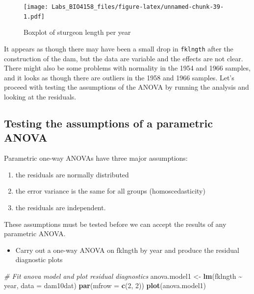 \documentclass[
  12pt,
]{book}
\newenvironment{Shaded}{\begin{snugshade}}{\end{snugshade}}
\newcommand{\CommentTok}[1]{\textcolor[rgb]{0.56,0.35,0.01}{\textit{#1}}}
\newcommand{\DataTypeTok}[1]{\textcolor[rgb]{0.13,0.29,0.53}{#1}}
\newcommand{\DecValTok}[1]{\textcolor[rgb]{0.00,0.00,0.81}{#1}}
\newcommand{\KeywordTok}[1]{\textcolor[rgb]{0.13,0.29,0.53}{\textbf{#1}}}
\newcommand{\NormalTok}[1]{#1}
\newcommand{\OperatorTok}[1]{\textcolor[rgb]{0.81,0.36,0.00}{\textbf{#1}}}
\newcommand{\StringTok}[1]{\textcolor[rgb]{0.31,0.60,0.02}{#1}}
\providecommand{\tightlist}{%
  \setlength{\itemsep}{0pt}\setlength{\parskip}{0pt}}
\begin{document}
\begin{figure}
\centering
\texttt{[image: Labs\_BIO4158\_files/figure-latex/unnamed-chunk-39-1.pdf]}
\caption{\label{fig:unnamed-chunk-39}Boxplot of sturgeon length per year}
\end{figure}

It appears as though there may have been a small drop in \texttt{fklngth} after the construction of the dam, but the data are variable and the effects are not clear. There might also be some problems with normality in the 1954 and 1966 samples, and it looks as though there are outliers in the 1958 and 1966 samples. Let's proceed with testing the assumptions of the ANOVA by running the analysis and looking at the residuals.

\hypertarget{testing-the-assumptions-of-a-parametric-anova}{%
\subsection{Testing the assumptions of a parametric ANOVA}\label{testing-the-assumptions-of-a-parametric-anova}}

Parametric one-way ANOVAs have three major assumptions:

\begin{enumerate}
\def\labelenumi{\arabic{enumi}.}
\tightlist
\item
  the residuals are normally distributed
\item
  the error variance is the same for all groups (homoscedasticity)
\item
  the residuals are independent.
\end{enumerate}

These assumptions must be tested before we can accept the results of any parametric ANOVA.

\begin{itemize}
\tightlist
\item
  Carry out a one-way ANOVA on fklngth by year and produce the residual diagnostic plots
\end{itemize}

\begin{Shaded}
\begin{Highlighting}[]
\CommentTok{\# Fit anova model and plot residual diagnostics}
\NormalTok{anova.model1 \textless{}{-}}\StringTok{ }\KeywordTok{lm}\NormalTok{(fklngth }\OperatorTok{\textasciitilde{}}\StringTok{ }\NormalTok{year, }\DataTypeTok{data =}\NormalTok{ dam10dat)}
\KeywordTok{par}\NormalTok{(}\DataTypeTok{mfrow =} \KeywordTok{c}\NormalTok{(}\DecValTok{2}\NormalTok{, }\DecValTok{2}\NormalTok{))}
\KeywordTok{plot}\NormalTok{(anova.model1)}
\end{Highlighting}
\end{Shaded}
\end{document}
